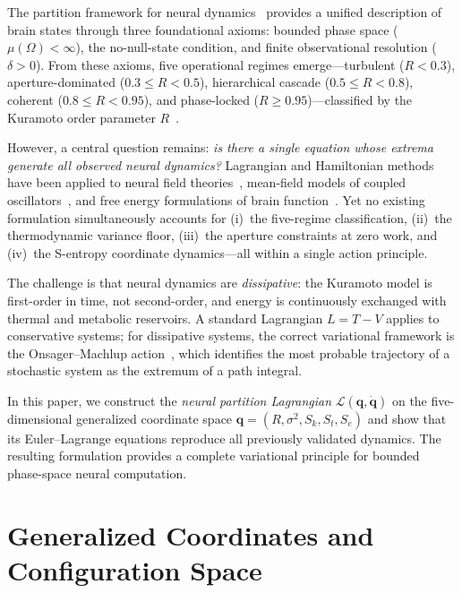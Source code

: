 \documentclass[twocolumn,aps,prl,superscriptaddress,floatfix]{revtex4-2}
\newcommand{\Lag}{\mathcal{L}}
\newcommand{\Sk}{S_k}
\newcommand{\St}{S_t}
\newcommand{\Se}{S_e}
\newcommand{\qvec}{\mathbf{q}}
\begin{document}
The partition framework for neural dynamics~\cite{sachikonye2026regime,sachikonye2026aperture,sachikonye2026operator} provides a unified description of brain states through three foundational axioms: bounded phase space ($\mu(\Omega) < \infty$), the no-null-state condition, and finite observational resolution ($\delta > 0$).
From these axioms, five operational regimes emerge---turbulent ($R < 0.3$), aperture-dominated ($0.3 \leq R < 0.5$), hierarchical cascade ($0.5 \leq R < 0.8$), coherent ($0.8 \leq R < 0.95$), and phase-locked ($R \geq 0.95$)---classified by the Kuramoto order parameter $R$~\cite{kuramoto1975,strogatz2000,acebron2005}.

However, a central question remains: \emph{is there a single equation whose extrema generate all observed neural dynamics?}
Lagrangian and Hamiltonian methods have been applied to neural field theories~\cite{robinson2005,deco2008,breakspear2017}, mean-field models of coupled oscillators~\cite{ott2008,pikovsky2015}, and free energy formulations of brain function~\cite{friston2006,friston2010}.
Yet no existing formulation simultaneously accounts for (i)~the five-regime classification, (ii)~the thermodynamic variance floor, (iii)~the aperture constraints at zero work, and (iv)~the S-entropy coordinate dynamics---all within a single action principle.

The challenge is that neural dynamics are \emph{dissipative}: the Kuramoto model is first-order in time, not second-order, and energy is continuously exchanged with thermal and metabolic reservoirs.
A standard Lagrangian $L = T - V$ applies to conservative systems; for dissipative systems, the correct variational framework is the Onsager--Machlup action~\cite{onsager1953,machlup1953,graham1977}, which identifies the most probable trajectory of a stochastic system as the extremum of a path integral.

In this paper, we construct the \emph{neural partition Lagrangian} $\Lag(\qvec, \dot{\qvec})$ on the five-dimensional generalized coordinate space $\qvec = (R, \sigma^2, \Sk, \St, \Se)$ and show that its Euler--Lagrange equations reproduce all previously validated dynamics.
The resulting formulation provides a complete variational principle for bounded phase-space neural computation.


\section{Generalized Coordinates and Configuration Space}
\label{sec:coordinates}
\end{document}
